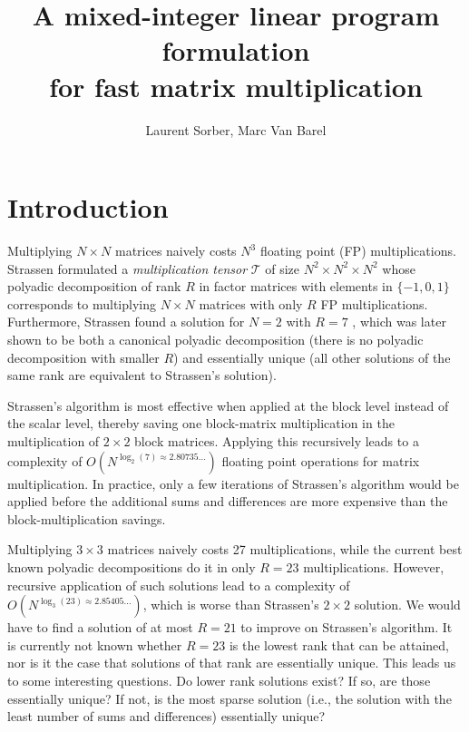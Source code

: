 \documentclass{article}
\begin{document}
\title{A mixed-integer linear program formulation\\for fast matrix multiplication}
\author{Laurent Sorber, Marc Van Barel}
\maketitle

\section{Introduction}

Multiplying $N \times N$ matrices naively costs $N^3$ floating point (FP) multiplications. Strassen formulated a \emph{multiplication tensor} $\mathcal{T}$ of size $N^2 \times N^2 \times N^2$ whose polyadic decomposition of rank $R$ in factor matrices with elements in $\{-1, 0, 1\}$ corresponds to multiplying $N \times N$ matrices with only $R$ FP multiplications. Furthermore, Strassen found a solution for $N=2$ with $R=7$ \cite{Strassen1969}, which was later shown to be both a canonical polyadic decomposition \cite{Brockett78,Hopcroft71,Winograd71} (there is no polyadic decomposition with smaller $R$) and essentially unique \cite{DeGroote78} (all other solutions of the same rank are equivalent to Strassen's solution).

Strassen's algorithm is most effective when applied at the block level instead of the scalar level, thereby saving one block-matrix multiplication in the multiplication of $2 \times 2$ block matrices. Applying this recursively leads to a complexity of $O(N^{\log_2(7) \approx 2.80735...})$ floating point operations for matrix multiplication. In practice, only a few iterations of Strassen's algorithm would be applied before the additional sums and differences are more expensive than the block-multiplication savings.

Multiplying $3 \times 3$ matrices naively costs 27 multiplications, while the current best known polyadic decompositions do it in only $R = 23$ multiplications. However, recursive application of such solutions lead to a complexity of $O(N^{\log_3(23) \approx 2.85405...})$, which is worse than Strassen's $2 \times 2$ solution. We would have to find a solution of at most $R = 21$ to improve on Strassen's algorithm. It is currently not known whether $R = 23$ is the lowest rank that can be attained, nor is it the case that solutions of that rank are essentially unique. This leads us to some interesting questions. Do lower rank solutions exist? If so, are those essentially unique? If not, is the most sparse solution (i.e., the solution with the least number of sums and differences) essentially unique?
\end{document}
